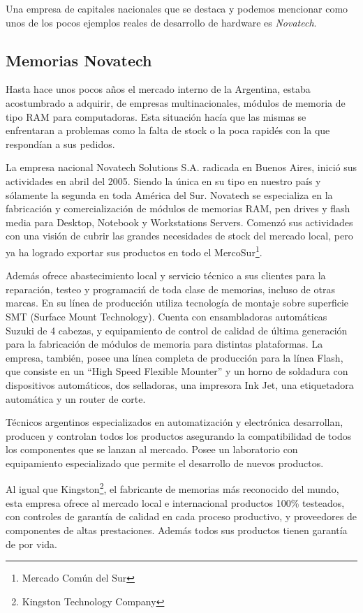 \documentclass[%
 	final,
%
	notitlepage,
	narroweqnarray,
	inline,
 	twoside,
	]{ieee}
\begin{document}
Una empresa de capitales nacionales que se destaca y podemos mencionar como unos de los pocos ejemplos reales de desarrollo de hardware es \textit{Novatech}.

\subsection*{Memorias Novatech}

Hasta hace unos pocos a\~nos el mercado interno de la Argentina, estaba acostumbrado a adquirir, de empresas multinacionales, m\'odulos de memoria de tipo RAM para computadoras. Esta situaci\'on hac\'ia que las mismas se enfrentaran a problemas como la falta de stock o la poca rapid\'es con la que respond\'ian a sus pedidos.

La empresa nacional Novatech Solutions S.A. radicada en Buenos Aires, inici\'o sus actividades en abril del 2005. Siendo la \'unica en su tipo en nuestro pa\'is y s\'olamente la segunda en toda Am\'erica del Sur. Novatech se especializa en la fabricaci\'on y comercializaci\'on de m\'odulos de memorias RAM, pen drives y flash media para Desktop, Notebook y Workstations Servers. Comenz\'o sus actividades con una visi\'on de cubrir las grandes necesidades de stock del mercado local, pero ya ha logrado exportar sus productos en todo el MercoSur\footnote{Mercado Com\'un del Sur\cite{mercosur}}.

Adem\'as ofrece abastecimiento local y servicio t\'ecnico a sus clientes para la reparaci\'on, testeo y programaci\'n de toda clase de memorias, incluso de otras marcas. En su l\'inea de producci\'on utiliza tecnolog\'ia de montaje sobre superficie SMT (Surface Mount Technology). Cuenta con ensambladoras autom\'aticas Suzuki de 4 cabezas, y equipamiento de control de calidad de \'ultima generaci\'on para la fabricaci\'on de m\'odulos de memoria para distintas plataformas. La empresa, tambi\'en, posee una l\'inea completa de producci\'on para la l\'inea Flash, que consiste en un ``High Speed Flexible Mounter'' y un horno de soldadura con dispositivos autom\'aticos, dos selladoras, una impresora Ink Jet, una etiquetadora autom\'atica y un router de corte.

T\'ecnicos argentinos especializados en automatizaci\'on y electr\'onica desarrollan, producen y controlan todos los productos asegurando la compatibilidad de todos los componentes que se lanzan al mercado. Posee un laboratorio con equipamiento especializado que permite el desarrollo de nuevos productos.

Al igual que Kingston\footnote{Kingston Technology Company\cite{kingston}}, el fabricante de memorias m\'as reconocido del mundo, esta empresa ofrece al mercado local e internacional productos 100\% testeados, con controles de garant\'ia de calidad en cada proceso productivo, y proveedores de componentes de altas prestaciones. Adem\'as todos sus productos tienen garant\'ia de por vida.
\end{document}

